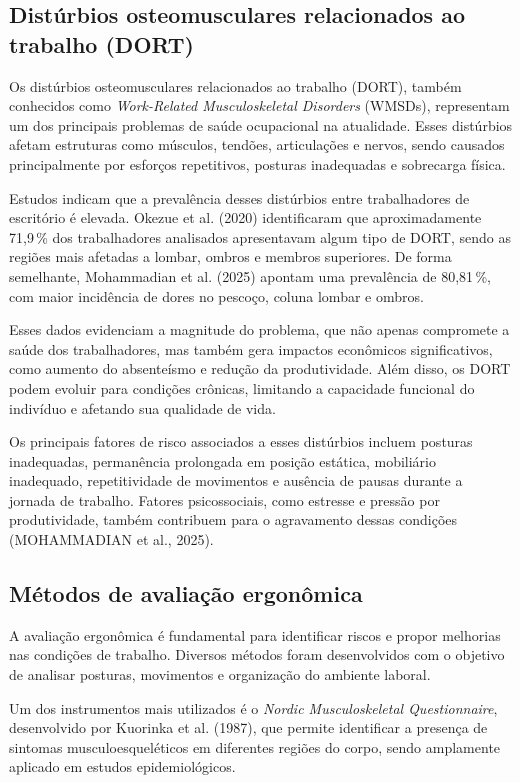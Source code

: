 \documentclass[12pt,a4paper]{article}
\begin{document}
\subsection{Distúrbios osteomusculares relacionados ao trabalho (DORT)}

Os distúrbios osteomusculares relacionados ao trabalho (DORT), também conhecidos
como \emph{Work-Related Musculoskeletal Disorders} (WMSDs), representam um dos
principais problemas de saúde ocupacional na atualidade. Esses distúrbios afetam
estruturas como músculos, tendões, articulações e nervos, sendo causados
principalmente por esforços repetitivos, posturas inadequadas e sobrecarga física.

Estudos indicam que a prevalência desses distúrbios entre trabalhadores de
escritório é elevada. Okezue et al. (2020) identificaram que aproximadamente
71,9\,\% dos trabalhadores analisados apresentavam algum tipo de DORT, sendo as
regiões mais afetadas a lombar, ombros e membros superiores. De forma semelhante,
Mohammadian et al. (2025) apontam uma prevalência de 80,81\,\%, com maior incidência
de dores no pescoço, coluna lombar e ombros.

Esses dados evidenciam a magnitude do problema, que não apenas compromete a saúde
dos trabalhadores, mas também gera impactos econômicos significativos, como aumento
do absenteísmo e redução da produtividade. Além disso, os DORT podem evoluir para
condições crônicas, limitando a capacidade funcional do indivíduo e afetando sua
qualidade de vida.

Os principais fatores de risco associados a esses distúrbios incluem posturas
inadequadas, permanência prolongada em posição estática, mobiliário inadequado,
repetitividade de movimentos e ausência de pausas durante a jornada de trabalho.
Fatores psicossociais, como estresse e pressão por produtividade, também contribuem
para o agravamento dessas condições (MOHAMMADIAN et al., 2025).

\subsection{Métodos de avaliação ergonômica}

A avaliação ergonômica é fundamental para identificar riscos e propor melhorias nas
condições de trabalho. Diversos métodos foram desenvolvidos com o objetivo de
analisar posturas, movimentos e organização do ambiente laboral.

Um dos instrumentos mais utilizados é o \emph{Nordic Musculoskeletal Questionnaire},
desenvolvido por Kuorinka et al. (1987), que permite identificar a presença de
sintomas musculoesqueléticos em diferentes regiões do corpo, sendo amplamente
aplicado em estudos epidemiológicos.
\end{document}
